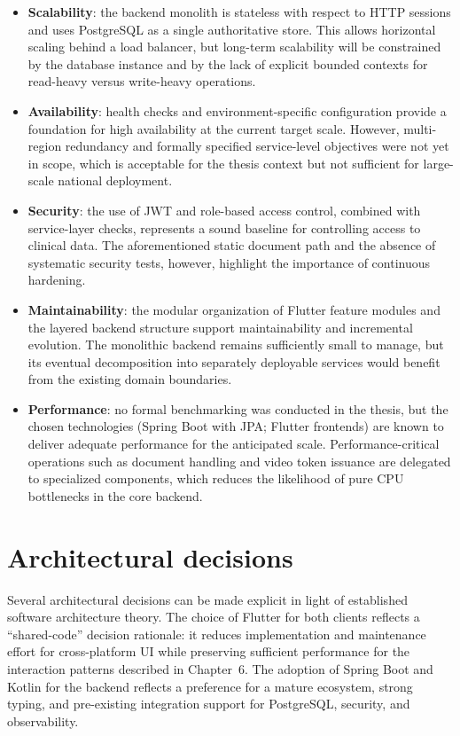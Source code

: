 \documentclass[11pt,a4paper,twoside,openany,headings=normal]{scrreprt}
\begin{document}
\begin{itemize}[leftmargin=*]
  \item \textbf{Scalability}: the backend monolith is stateless with respect to HTTP sessions and uses PostgreSQL as a single authoritative store. This allows horizontal scaling behind a load balancer, but long-term scalability will be constrained by the database instance and by the lack of explicit bounded contexts for read-heavy versus write-heavy operations.
  \item \textbf{Availability}: health checks and environment-specific configuration provide a foundation for high availability at the current target scale. However, multi-region redundancy and formally specified service-level objectives were not yet in scope, which is acceptable for the thesis context but not sufficient for large-scale national deployment.
  \item \textbf{Security}: the use of JWT and role-based access control, combined with service-layer checks, represents a sound baseline for controlling access to clinical data. The aforementioned static document path and the absence of systematic security tests, however, highlight the importance of continuous hardening.
  \item \textbf{Maintainability}: the modular organization of Flutter feature modules and the layered backend structure support maintainability and incremental evolution. The monolithic backend remains sufficiently small to manage, but its eventual decomposition into separately deployable services would benefit from the existing domain boundaries.
  \item \textbf{Performance}: no formal benchmarking was conducted in the thesis, but the chosen technologies (Spring Boot with JPA; Flutter frontends) are known to deliver adequate performance for the anticipated scale. Performance-critical operations such as document handling and video token issuance are delegated to specialized components, which reduces the likelihood of pure CPU bottlenecks in the core backend.
\end{itemize}

\section{Architectural decisions}

Several architectural decisions can be made explicit in light of established software architecture theory. The choice of Flutter for both clients reflects a ``shared-code'' decision rationale: it reduces implementation and maintenance effort for cross-platform UI while preserving sufficient performance for the interaction patterns described in Chapter~6. The adoption of Spring Boot and Kotlin for the backend reflects a preference for a mature ecosystem, strong typing, and pre-existing integration support for PostgreSQL, security, and observability.
\end{document}

